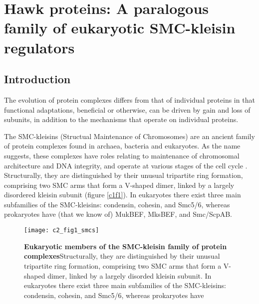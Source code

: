 \documentclass[a4paper,11pt,twoside,openright]{scrbook}
\begin{document}
\chapter{Hawk proteins: A paralogous family of eukaryotic SMC-kleisin regulators}


\section{Introduction}
The evolution of protein complexes differs from that of individual proteins in that functional adaptations, beneficial or otherwise, can be driven by gain and loss of subunits, in addition to the mechanisms that operate on individual proteins.

The SMC-kleisins (Structual Maintenance of Chromosomes) are an ancient family of protein complexes found in archaea, bacteria and eukaryotes. As the name suggests, these complexes have roles relating to maintenance of chromosomal architecture and DNA integrity, and operate at various stages of the cell cycle \cite{Nasmyth2009, Hirano2016}. Structurally, they are distinguished by their unusual tripartite ring formation, comprising two SMC arms that form a V-shaped dimer, linked by a largely disordered kleisin subunit (figure \ref{c1f1}). In eukaryotes there exist three main subfamilies of the SMC-kleisins: condensin, cohesin, and Smc5/6, whereas prokaryotes have (that we know of) MukBEF, MksBEF, and Smc/ScpAB.

\begin{figure}[h]
\fcapsideright
    {\caption[Eukaryotic members of the SMC-kleisin family of protein complexes]{\sffamily\textbf{Eukaryotic members of the SMC-kleisin family of protein complexes}\newline \small Structurally, they are distinguished by their unusual tripartite ring formation, comprising two SMC arms that form a V-shaped dimer, linked by a largely disorded kleisin subunit. In eukaryotes there exist three main subfamilies of the SMC-kleisins: condensin, cohesin, and Smc5/6, whereas prokaryotes have }\label{c2f1}}
    {\texttt{[image: c2\_fig1\_smcs]}}
\end{figure}
\end{document}
